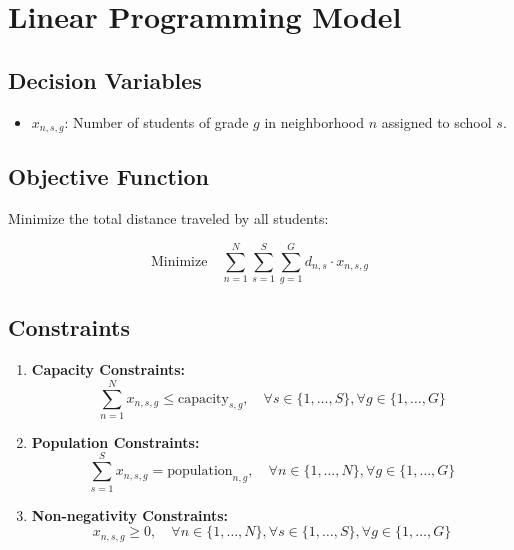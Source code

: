 \documentclass{article}
\begin{document}
\section*{Linear Programming Model}

\subsection*{Decision Variables}
\begin{itemize}
    \item \( x_{n,s,g} \): Number of students of grade \( g \) in neighborhood \( n \) assigned to school \( s \).
\end{itemize}

\subsection*{Objective Function}
Minimize the total distance traveled by all students:

\[
\text{Minimize} \quad \sum_{n=1}^{N} \sum_{s=1}^{S} \sum_{g=1}^{G} d_{n,s} \cdot x_{n,s,g}
\]

\subsection*{Constraints}

\begin{enumerate}
    \item \textbf{Capacity Constraints:}
    \[
    \sum_{n=1}^{N} x_{n,s,g} \leq \text{capacity}_{s,g}, \quad \forall s \in \{1, \ldots, S\}, \forall g \in \{1, \ldots, G\}
    \]

    \item \textbf{Population Constraints:}
    \[
    \sum_{s=1}^{S} x_{n,s,g} = \text{population}_{n,g}, \quad \forall n \in \{1, \ldots, N\}, \forall g \in \{1, \ldots, G\}
    \]

    \item \textbf{Non-negativity Constraints:}
    \[
    x_{n,s,g} \geq 0, \quad \forall n \in \{1, \ldots, N\}, \forall s \in \{1, \ldots, S\}, \forall g \in \{1, \ldots, G\}
    \]
\end{enumerate}
\end{document}
